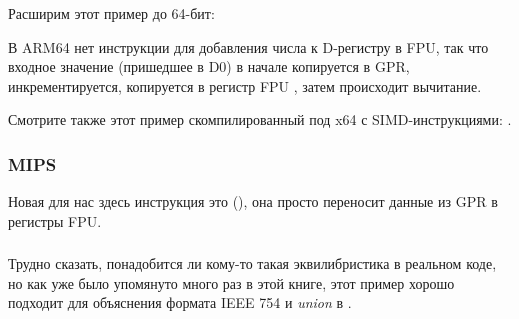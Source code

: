 Расширим этот пример до 64-бит:



В ARM64 нет инструкции для добавления числа к D-регистру в FPU, так что входное значение
(пришедшее в D0) в начале копируется в \ac{GPR},
инкрементируется, копируется в регистр FPU , затем происходит вычитание.



Смотрите также этот пример скомпилированный под x64 с SIMD-инструкциями: .

\subsubsection{MIPS}

Новая для нас здесь инструкция это  (), она просто переносит данные из \ac{GPR} в регистры FPU.



\subsubsection{\Conclusion}

Трудно сказать, понадобится ли кому-то такая эквилибристика в реальном коде,
но как уже было упомянуто много раз в этой книге, этот пример хорошо подходит для объяснения формата
IEEE 754 и \emph{union} в \CCpp.

